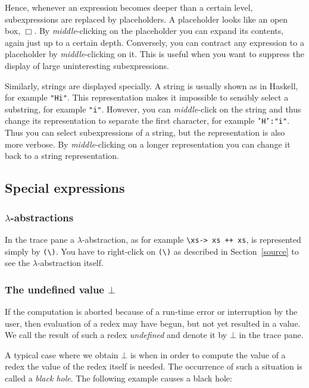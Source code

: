 \documentclass[12pt]{article}
\newcommand{\emptyBox}{\Box}
\begin{document}
Hence, whenever an expression becomes deeper than a certain level, subexpressions are replaced by placeholders. A placeholder looks like an open box, $\emptyBox$. By \emph{middle}-clicking on the placeholder you can expand its contents, again just up to a certain depth. Conversely, you can contract any expression to a placeholder by \emph{middle}-clicking on it. This is useful when you want to suppress the display of large uninteresting subexpressions.

Similarly, strings are displayed specially. A string is usually shown as in Haskell, for example \texttt{"Hi"}. This representation makes it impossible to sensibly select a substring, for example \texttt{"i"}. However, you can \emph{middle}-click on the string and thus change its representation to separate the first character, for example \texttt{'H':"i"}. Thus you can select subexpressions of a string, but the representation is also more verbose. By \emph{middle}-clicking on a longer representation you can change it back to a string representation.


\subsection{Special expressions}

\subsubsection{$\lambda$-abstractions}

In the trace pane a $\lambda$-abstraction, as for example 
\verb?\xs-> xs ++ xs?,
is represented simply by \verb?(\)?.
You have to right-click on \verb?(\)? as described in Section~\ref{source} to see the $\lambda$-abstraction itself.

\subsubsection{The undefined value $\bot$}

If the computation is aborted because of a run-time error or interruption by the user, then evaluation of a redex may have begun, but not yet resulted in a value. We call the result of such a redex \emph{undefined} and denote it by $\bot$ in the trace pane.

A typical case where we obtain $\bot$ is when in order to compute the value of a redex the value of the redex itself is needed. The occurrence of such a situation is called a \emph{black hole}. The following example causes a black hole:
\end{document}
